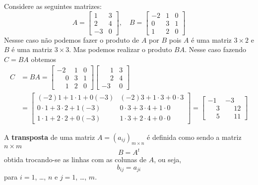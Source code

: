 \documentclass{beamer}
\begin{document}
  \begin{frame}
    \begin{exemplo}
      Considere as seguintes matrizes:
      \[
        A = \begin{bmatrix}
          1 & 3\\
          2 & 4\\
          -3 & 0
        \end{bmatrix},\quad
        B = \begin{bmatrix}
          -2 & 1 & 0\\
          0 & 3 & 1\\
          1 & 2 & 0
        \end{bmatrix}
      \]
      Nessse caso não podemos fazer o produto de $A$ por $B$ pois $A$ é uma matriz $3 \times 2$ e $B$ é uma matriz $3 \times 3$.
      Mas podemos realizar o produto $BA$. Nesse caso fazendo $C = BA$ obtemos
      \begin{align*}
        C &= BA = \begin{bmatrix}
          -2 & 1 & 0\\
          \phantom{-}0 & 3 & 1\\
          \phantom{-}1 & 2 & 0
        \end{bmatrix}\begin{bmatrix}
          \phantom{-}1 & 3\\
          \phantom{-}2 & 4\\
          -3 & 0
        \end{bmatrix} \\
        &= \begin{bmatrix}
          (-2)1 + 1\cdot 1 + 0(-3) & (-2)3 + 1\cdot 3 + 0\cdot 3\\
          0\cdot 1 + 3\cdot 2 + 1(-3) & 0\cdot 3 + 3\cdot 4 + 1\cdot 0\\
          1 \cdot 1 + 2 \cdot 2 + 0(-3) & 1 \cdot 3 + 2 \cdot 4 + 0\cdot 0
        \end{bmatrix}
        = \begin{bmatrix}
          -1 & -3\\
          \phantom{-}3 & \phantom{-}12\\
          \phantom{-}5 & \phantom{-}11
        \end{bmatrix}
      \end{align*}
    \end{exemplo}
  \end{frame}

  \begin{frame}
    \begin{definicao}
      A \textbf{transposta} de uma matriz $A = (a_{ij})_{m \times n}$ é definida como sendo a matriz $n \times m$
      \[
        B = A^t
      \]
      obtida trocando-se as linhas com as colunas de $A$, ou seja,
      \[
        b_{ij} = a_{ji}
      \]
      para $i = 1$, \dots, $n$ e $j = 1$, \dots, $m$.
    \end{definicao}
  \end{frame}
\end{document}
